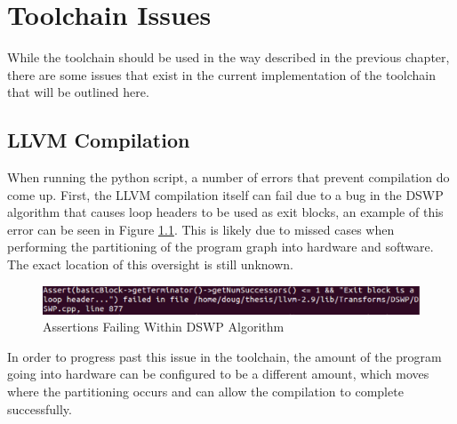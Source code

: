 \chapter{Toolchain Issues \label{chap:Issues}}
While the toolchain should be used in the way described in the previous chapter, there are some issues that exist in the current implementation of the toolchain that will be outlined here.
\section{LLVM Compilation}
When running the python script, a number of errors that prevent compilation do come up. First, the LLVM compilation itself can fail due to a bug in the DSWP algorithm that causes loop headers to be used as exit blocks, an example of this error can be seen in Figure \ref{fig:dswp_compile_fail}. This is likely due to missed cases when performing the partitioning of the program graph into hardware and software. The exact location of this oversight is still unknown.

\begin{figure}
	\centering
		\includegraphics[width=\textwidth]{figures/DSWP_Compilation_Failure}
	\caption{Assertions Failing Within DSWP Algorithm\label{fig:dswp_compile_fail}}
\end{figure}

In order to progress past this issue in the toolchain, the amount of the program going into hardware can be configured to be a different amount, which moves where the partitioning occurs and can allow the compilation to complete successfully.